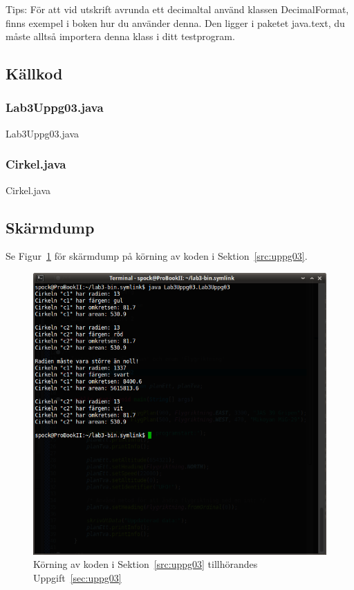 Tips: För att vid utskrift avrunda ett decimaltal använd klassen
DecimalFormat, finns exempel i boken hur du använder denna. Den ligger i
paketet java.text, du måste alltså importera denna klass i ditt testprogram.


\subsection{Källkod}
\subsubsection{Lab3Uppg03.java}
\caption{Lab3Uppg03.java}
\label{src:uppg03}

\subsubsection{Cirkel.java}
\caption{Cirkel.java}
\label{src:cirkel}


\subsection{Skärmdump}
Se Figur~\ref{fig:uppg03-screenshot} för skärmdump på körning av koden i
Sektion~\ref{src:uppg03}.

\begin{figure}[htbp]
    \centering
        \includegraphics[width=\linewidth]{img/03.png}
        \caption{Körning av koden i Sektion~\ref{src:uppg03} tillhörandes Uppgift~\ref{sec:uppg03}}
    \label{fig:uppg03-screenshot}
\end{figure}

